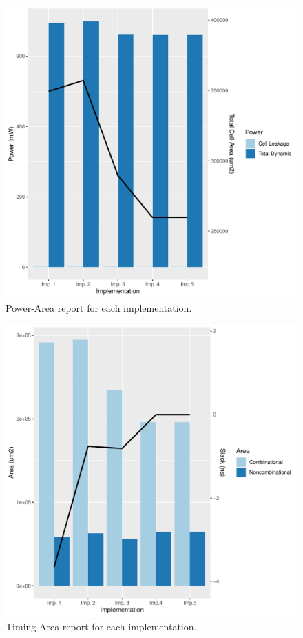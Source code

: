 \documentclass[journal,comsoc]{IEEEtran}
\begin{document}
\begin{figure} 
	\centering
	\includegraphics[width=\linewidth]{Diagramas/report_area.pdf}
	\caption{Power-Area report for each implementation.}
	\label{fig:area_rep}
\end{figure}


\begin{figure} 
	\centering
	\includegraphics[width=\linewidth]{Diagramas/report_time.pdf}
	\caption{Timing-Area report for each implementation.}
	\label{fig:time_rep}
\end{figure}
\end{document}
